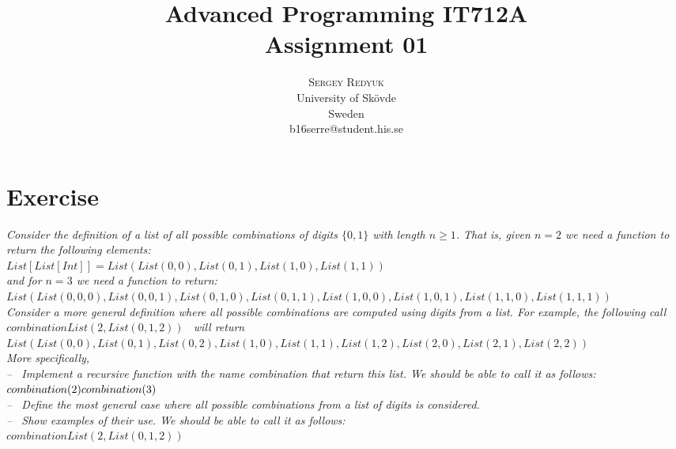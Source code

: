 \documentclass[a4paper]{article}
\title{Advanced Programming IT712A \\
Assignment 01} %
\author{%
\textsc{Sergey Redyuk} \\[1ex]%
\normalsize University of Sk\"{o}vde \\ %
\normalsize Sweden \\
\normalsize b16serre@student.his.se %
}
\date{} %
\begin{document}
\maketitle

\section{Exercise}
\emph{Consider the definition of a list of all possible combinations of digits $\{0, 1\}$ with length $n \geq 1$. That is, given $n = 2$ we need a function to return the following elements: \\
\newline
$List[List[Int]] = List(List(0, 0), List(0, 1), List(1, 0), List(1, 1))$ \\
\newline
and for $n = 3$ we need a function to return: \\
\newline
$List(List(0, 0, 0), List(0, 0, 1), List(0, 1, 0), List(0, 1, 1), List(1, 0, 0), List(1, 0, 1), List(1, 1, 0), List(1, 1, 1))$ \\
\newline
Consider a more general definition where all possible combinations are computed using digits from a list. For example, the following call \ $combinationList(2, List(0, 1, 2))$ \ will return \\
\newline
$List(List(0, 0), List(0, 1), List(0, 2), List(1, 0), List(1, 1), List(1, 2), List(2, 0), List(2, 1), List(2, 2))$ \\
\newline
More specifically, \\
-- \ Implement a recursive function with the name combination that return this list. We should be able to call it as follows: \\
\newline
$combination(2) \\ combination(3)$ \\
\newline
-- \ Define the most general case where all possible combinations from a list of digits is considered. \\
-- \ Show examples of their use. We should be able to call it as follows: \\
\newline
$combinationList(2, List(0, 1, 2))$ \\
}
\end{document}
